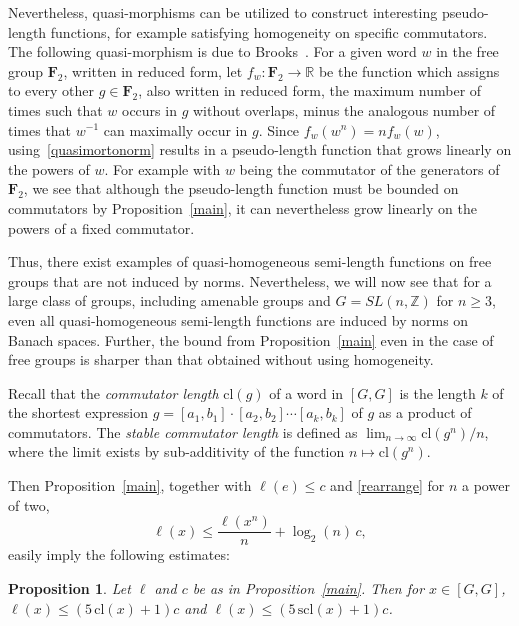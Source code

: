 \documentclass[11pt,a4paper,reqno]{amsart}
\numberwithin{equation}{section}
\theoremstyle{plain}
\newtheorem{proposition}[equation]{Proposition}
\theoremstyle{definition}
\newcommand\R{\mathbb{R}}
\newcommand\Z{\mathbb{Z}}
\newcommand\normsymb{\ell}  %
\newcommand\norm[1]{\ell({#1})}   %
\newcommand\free[1]{\mathbf{F}_{#1}}
\begin{document}
Nevertheless, quasi-morphisms can be utilized to construct interesting
{ pseudo-length functions}, for example satisfying homogeneity on
specific commutators. The following quasi-morphism is due to
Brooks~\cite[Section~2]{Fu}.
For a given word $w$ in the free group $\free{2}$, written in reduced
form, let $f_w : \free{2} \to \R$ be the function which assigns to every
other $g\in \free{2}$, also written in reduced form, the maximum number
of times such that $w$ occurs in $g$ without overlaps, minus the
analogous number of times that $w^{-1}$ can maximally occur in $g$. Since
$f_w(w^n) = n f_w(w)$, { using~\eqref{quasimortonorm} results in a
pseudo-length function that grows linearly on the powers of $w$}. For example with $w$ being the
commutator of the generators of $\free{2}$, we see that although the
{ pseudo-length} function must be bounded on commutators by
{ Proposition~\ref{main}}, it can nevertheless grow linearly
on the powers of a fixed commutator.



Thus, there exist { examples of quasi-homogeneous semi-length functions on free groups} that are not induced by
norms. Nevertheless, we { will now} see that for a large class of groups, including
amenable groups and $G = SL(n, \Z)$ for $n\geq 3$, { even all quasi-homogeneous { semi-}length} functions are induced by norms on Banach spaces.
Further, the bound from { Proposition~\ref{main}} even in
the case of free groups is sharper than that obtained without using
homogeneity.

Recall that the \emph{commutator length} $\mathrm{cl}(g)$ of a word in
$[G, G]$ is the length $k$ of the shortest expression $g = [a_1,
b_1]\cdot[a_2, b_2]\cdots[a_k, b_k]$ of $g$ as a product of commutators.
The \emph{stable commutator length} is defined as $\lim_{n\to\infty}
\mathrm{cl}(g^n)/n$, where the limit exists by sub-additivity of the
function $n\mapsto \mathrm{cl}(g^n)$.

Then { Proposition~\ref{main}}, together with {$\norm{e} \leq c$ and
\eqref{rearrange} for $n$ a power of two,
\[
\norm{x} \leq \frac{\norm{x^n}}{n}  + \log_2(n)\, c,
\]}
easily imply the following estimates:

\begin{proposition}\label{commutatorbound}
{
Let $\normsymb$ and $c$ be as in
Proposition~\ref{main}. Then for
$x\in [G, G]$, $\norm{x}\leq (5\, \mathrm{cl}(x) + 1)c$
and $\norm{x}\leq (5\, \mathrm{scl}(x) + 1)c$.
}
\end{proposition}
\end{document}
